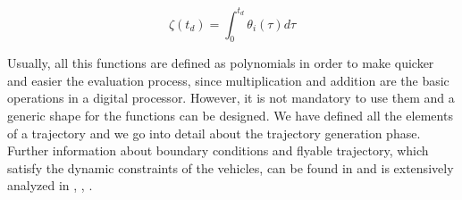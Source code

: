 \begin{equation}  \label{eq:zeta_law_def}
  \zeta( t_d ) = \int^{t_d}_0 \theta_i(\tau) d \tau
\end{equation}

Usually, all this functions are defined as polynomials in order to make quicker and
easier the evaluation process, since multiplication and addition are the basic
operations in a digital processor. However, it is not mandatory to use them and a
generic shape for the functions can be designed.
We have defined all the elements of a trajectory and we go into detail
about the trajectory generation phase.
Further information about boundary conditions and flyable trajectory, which satisfy
the dynamic constraints of the vehicles, can be found in \cite{cichellaMain} and
is extensively analyzed in \cite{trajGeneration1}, \cite{trajGeneration2},
\cite{trajGeneration3}.
